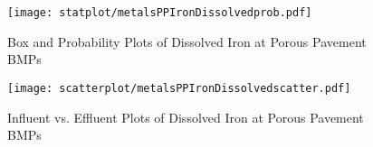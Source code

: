         \begin{figure}[hb]   %
            \centering
            \texttt{[image: statplot/metalsPPIronDissolvedprob.pdf]}
            \caption{Box and Probability Plots of Dissolved Iron at Porous Pavement BMPs}
        \end{figure}         %
        
        
        \begin{figure}[hb]   %
            \centering
            \texttt{[image: scatterplot/metalsPPIronDissolvedscatter.pdf]}
            \caption{Influent vs. Effluent Plots of Dissolved Iron at Porous Pavement BMPs}
        \end{figure}         %
        \clearpage
        